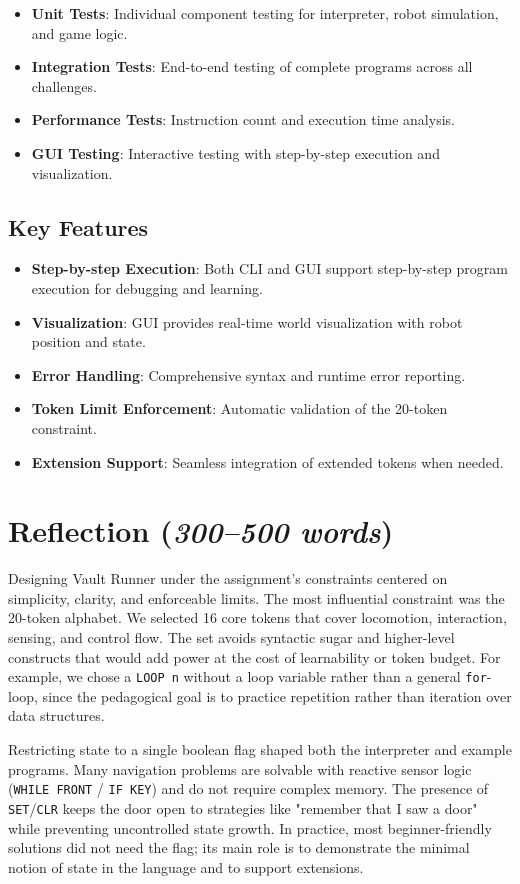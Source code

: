 \documentclass[11pt,a4paper]{article}
\begin{document}
\begin{itemize}[noitemsep]
  \item \textbf{Unit Tests}: Individual component testing for interpreter, robot simulation, and game logic.
  \item \textbf{Integration Tests}: End-to-end testing of complete programs across all challenges.
  \item \textbf{Performance Tests}: Instruction count and execution time analysis.
  \item \textbf{GUI Testing}: Interactive testing with step-by-step execution and visualization.
\end{itemize}

\subsection{Key Features}
\begin{itemize}[noitemsep]
  \item \textbf{Step-by-step Execution}: Both CLI and GUI support step-by-step program execution for debugging and learning.
  \item \textbf{Visualization}: GUI provides real-time world visualization with robot position and state.
  \item \textbf{Error Handling}: Comprehensive syntax and runtime error reporting.
  \item \textbf{Token Limit Enforcement}: Automatic validation of the 20-token constraint.
  \item \textbf{Extension Support}: Seamless integration of extended tokens when needed.
\end{itemize}

\section{Reflection (\textit{300--500 words})}
Designing Vault Runner under the assignment's constraints centered on simplicity, clarity, and enforceable limits. The most influential constraint was the 20-token alphabet. We selected 16 core tokens that cover locomotion, interaction, sensing, and control flow. The set avoids syntactic sugar and higher-level constructs that would add power at the cost of learnability or token budget. For example, we chose a \texttt{LOOP n} without a loop variable rather than a general \texttt{for}-loop, since the pedagogical goal is to practice repetition rather than iteration over data structures.

Restricting state to a single boolean flag shaped both the interpreter and example programs. Many navigation problems are solvable with reactive sensor logic (\texttt{WHILE FRONT} / \texttt{IF KEY}) and do not require complex memory. The presence of \texttt{SET}/\texttt{CLR} keeps the door open to strategies like "remember that I saw a door" while preventing uncontrolled state growth. In practice, most beginner-friendly solutions did not need the flag; its main role is to demonstrate the minimal notion of state in the language and to support extensions.
\end{document}
